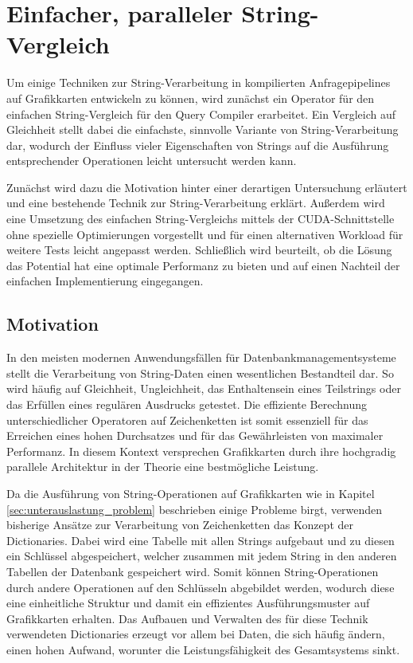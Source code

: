 \chapter{Einfacher, paralleler String-Vergleich}
\label{sec:equals_naiv}

Um einige Techniken zur String-Verarbeitung in kompilierten Anfragepipelines auf Grafikkarten entwickeln zu können, wird zunächst ein Operator für den einfachen String-Vergleich für den Query Compiler erarbeitet.
Ein Vergleich auf Gleichheit stellt dabei die einfachste, sinnvolle Variante von String-Verarbeitung dar, wodurch der Einfluss vieler Eigenschaften von Strings auf die Ausführung entsprechender Operationen leicht untersucht werden kann.

Zunächst wird dazu die Motivation hinter einer derartigen Untersuchung erläutert und eine bestehende Technik zur String-Verarbeitung erklärt.
Außerdem wird eine Umsetzung des einfachen String-Vergleichs mittels der CUDA-Schnittstelle ohne spezielle Optimierungen vorgestellt und für einen alternativen Workload für weitere Tests leicht angepasst werden.
Schließlich wird beurteilt, ob die Lösung das Potential hat eine optimale Performanz zu bieten und auf einen Nachteil der einfachen Implementierung eingegangen.

\section{Motivation}

In den meisten modernen Anwendungsfällen für Datenbankmanagementsysteme stellt die Verarbeitung von String-Daten einen wesentlichen Bestandteil dar.
So wird häufig auf Gleichheit, Ungleichheit, das Enthaltensein eines Teilstrings oder das Erfüllen eines regulären Ausdrucks getestet.
Die effiziente Berechnung unterschiedlicher Operatoren auf Zeichenketten ist somit essenziell für das Erreichen eines hohen Durchsatzes und für das Gewährleisten von maximaler Performanz.
In diesem Kontext versprechen Grafikkarten durch ihre hochgradig parallele Architektur in der Theorie eine bestmögliche Leistung.

Da die Ausführung von String-Operationen auf Grafikkarten wie in Kapitel \ref{sec:unterauslastung_problem} beschrieben einige Probleme birgt, verwenden bisherige Ansätze zur Verarbeitung von Zeichenketten das Konzept der Dictionaries.
Dabei wird eine Tabelle mit allen Strings aufgebaut und zu diesen ein Schlüssel abgespeichert, welcher zusammen mit jedem String in den anderen Tabellen der Datenbank gespeichert wird.
Somit können String-Operationen durch andere Operationen auf den Schlüsseln abgebildet werden, wodurch diese eine einheitliche Struktur und damit ein effizientes Ausführungsmuster auf Grafikkarten erhalten.
Das Aufbauen und Verwalten des für diese Technik verwendeten Dictionaries erzeugt vor allem bei Daten, die sich häufig ändern, einen hohen Aufwand, worunter die Leistungsfähigkeit des Gesamtsystems sinkt.

